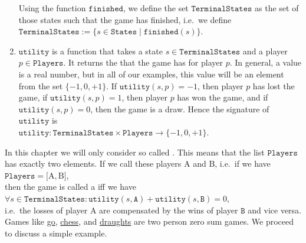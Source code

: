 \begin{enumerate}
      Using the function $\texttt{finished}$, we define the set $\texttt{TerminalStates}$ as the set of those
      states such that the game has finished,  i.e.~we define 
      \\[0.2cm]
      \hspace*{1.3cm}
      $\texttt{TerminalStates} := \{ s \in \texttt{States} \mid \texttt{finished}(s) \}$.
\item $\texttt{utility}$ is a function that takes a state $s \in \texttt{TerminalStates}$ and a player $p \in \texttt{Players}$.  It returns
      the  that the game has for player $p$.  In general, a value is a real number,  but in all of
      our examples, this value will be an element from the set $\{-1, 0, +1\}$.  If $\texttt{utility}(s, p) = -1$,
      then player $p$ has lost the game, if $\texttt{utility}(s, p) = 1$, then player $p$ has won the game, and
      if $\texttt{utility}(s, p) = 0$, then the game is a draw.  Hence the signature of $\texttt{utility}$ is
      \\[0.2cm]
      \hspace*{1.3cm}
      $\texttt{utility}: \texttt{TerminalStates} \times \texttt{Players} \rightarrow \{ -1, 0, +1\}$.
\end{enumerate}
In this chapter we will only consider so called .  
This means that the list $\texttt{Players}$ has exactly two elements.  If we call these players $\mathrm{A}$ and $\mathrm{B}$, i.e.~if we have
\\[0.2cm]
\hspace*{1.3cm}
$\texttt{Players} = \bigl[ \mathrm{A}, \mathrm{B} \bigr]$,
\\[0.2cm]
then the game is called a   iff we have
\\[0.2cm]
\hspace*{1.3cm}
$\forall s \in \texttt{TerminalStates}:\texttt{utility}(s, \texttt{A}) + \texttt{utility}(s, \texttt{B}) = 0$,
\\[0.2cm]
i.e.~the losses of player $\mathrm{A}$ are compensated by the wins of player $\texttt{B}$ and vice versa.
Games like \href{https://en.wikipedia.org/wiki/Go_(game)}{go}, 
\href{https://en.wikipedia.org/wiki/Chess}{chess}, and
\href{https://en.wikipedia.org/wiki/Draughts}{draughts} are two person zero sum games.
We proceed to discuss a simple example.

